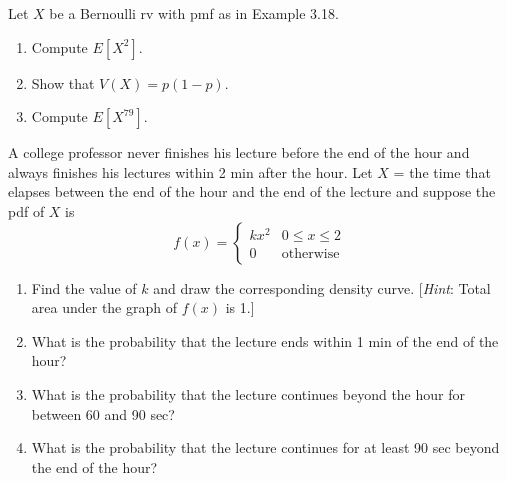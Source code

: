 \documentclass[11pt,letterpaper,boxed]{hmcpset}
\newcommand{\bk}[1]{\left[ #1 \right]}
\begin{document}
{\begin{solution}
	\vfill
\end{solution}
\newpage


\begin{problem}[3.3.33]
	Let $X$ be a Bernoulli rv with pmf as in Example 3.18.
	\begin{enumerate}
		\item
            Compute $E\bk{X^2}$.
		\item
			Show that $V(X) = p(1-p)$.
		\item
            Compute $E\bk{X^{79}}$.
	\end{enumerate}
\end{problem}

\begin{solution}
	\vfill
\end{solution}
\newpage


\begin{problem}[4.1.5]
	A college professor never finishes his lecture before the end of the hour and always finishes his lectures within 2 min after the hour. Let $X$ = the time that elapses between the end of the hour and the end of the lecture and suppose the pdf of $X$ is
		$$f(x) = \begin{cases}
			kx^2 & 0 \leq x \leq 2 \\
			0 & \mbox{otherwise}
		\end{cases}$$
	\begin{enumerate}
		\item
			Find the value of $k$ and draw the corresponding density curve. [\textit{Hint}: Total area under the graph of $f(x)$ is 1.]
		\item
			What is the probability that the lecture ends within 1 min of the end of the hour?
		\item
			What is the probability that the lecture continues beyond the hour for between 60 and 90 sec?
		\item
			What is the probability that the lecture continues for at least 90 sec beyond the end of the hour?
	\end{enumerate}
\end{problem}

\begin{solution}
	\vfill
\end{solution}
\newpage

}
\end{document}
